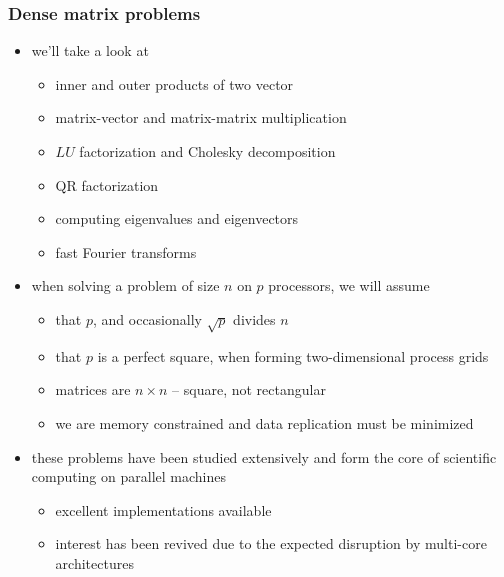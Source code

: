 %
%
%
%


\begin{frame}[fragile]
%
  \frametitle{Dense matrix problems}
%
  \begin{itemize}
%
  \item we'll take a look at
    \begin{itemize}
    \item inner and outer products of two vector
    \item matrix-vector and matrix-matrix multiplication
    \item $LU$ factorization and Cholesky decomposition
    \item QR factorization
    \item computing eigenvalues and eigenvectors
    \item fast Fourier transforms
    \end{itemize}
%
  \item when solving a problem of size $n$ on $p$ processors, we will assume
    \begin{itemize}
    \item that $p$, and occasionally $\sqrt{p}$ divides $n$
    \item that $p$ is a perfect square, when forming two-dimensional process grids
    \item matrices are $n\times n$ -- square, not rectangular
    \item we are memory constrained and data replication must be minimized
    \end{itemize}
%
    \item these problems have been studied extensively and form the core of scientific
      computing on parallel machines
      \begin{itemize}
      \item excellent implementations available 
      \item interest has been revived due to the expected disruption by multi-core
        architectures
      \end{itemize}
%
  \end{itemize}
%
\end{frame}

